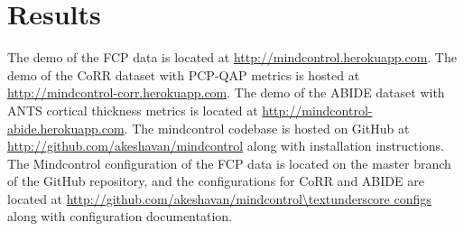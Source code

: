 \section{Results}

The demo of the FCP data is located at \url{http://mindcontrol.herokuapp.com}. The demo of the CoRR dataset with PCP-QAP metrics is hosted at \url{http://mindcontrol-corr.herokuapp.com}. The demo of the ABIDE dataset with ANTS cortical thickness metrics is located at \url{http://mindcontrol-abide.herokuapp.com}. The mindcontrol codebase is hosted on GitHub at \url{http://github.com/akeshavan/mindcontrol} along with installation instructions. The Mindcontrol configuration of the FCP data is located on the master branch of the GitHub repository, and the configurations for CoRR and ABIDE are located at \url{http://github.com/akeshavan/mindcontrol\textunderscore configs} along with configuration documentation. 

